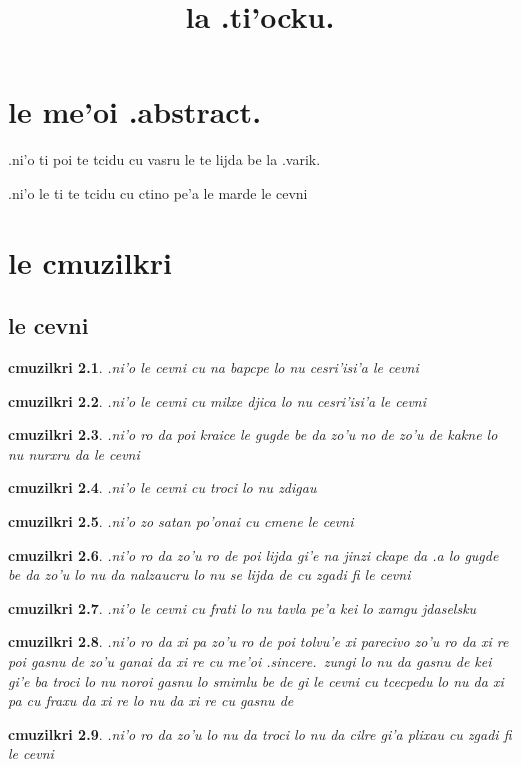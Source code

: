\documentclass{report}
\title{la .ti'ocku.}
\newtheorem{cmuzilkri}{cmuzilkri}
\begin{document}
\maketitle
\chapter{le me'oi .abstract.}
.ni'o ti poi te tcidu cu vasru le te lijda be la .varik.

.ni'o le ti te tcidu cu ctino pe'a le marde le cevni

\chapter{le cmuzilkri}
\section{le cevni}
\begin{cmuzilkri}
	.ni'o le cevni cu na bapcpe lo nu cesri'isi'a le cevni
\end{cmuzilkri}
\begin{cmuzilkri}
	.ni'o le cevni cu milxe djica lo nu cesri'isi'a le cevni
\end{cmuzilkri}
\begin{cmuzilkri}
	.ni'o ro da poi kraice le gugde be da zo'u no de zo'u de kakne lo nu nurxru da le cevni
\end{cmuzilkri}
\begin{cmuzilkri}
	.ni'o le cevni cu troci lo nu zdigau
\end{cmuzilkri}
\begin{cmuzilkri}
	.ni'o zo satan po'onai cu cmene le cevni
\end{cmuzilkri}
\begin{cmuzilkri}
	.ni'o ro da zo'u ro de poi lijda gi'e na jinzi ckape da .a lo gugde be da zo'u lo nu da nalzaucru lo nu se lijda de cu zgadi fi le cevni
\end{cmuzilkri}
\begin{cmuzilkri}
	.ni'o le cevni cu frati lo nu tavla pe'a kei lo xamgu jdaselsku
\end{cmuzilkri}
\begin{cmuzilkri}
	.ni'o ro da xi pa zo'u ro de poi tolvu'e xi parecivo zo'u ro da xi re poi gasnu de zo'u ganai da xi re cu me'oi .sincere.\ zungi lo nu da gasnu de kei gi'e ba troci lo nu noroi gasnu lo smimlu be de gi le cevni cu tcecpedu lo nu da xi pa cu fraxu da xi re lo nu da xi re cu gasnu de
\end{cmuzilkri}
\begin{cmuzilkri}
	.ni'o ro da zo'u lo nu da troci lo nu da cilre gi'a plixau cu zgadi fi le cevni
\end{cmuzilkri}
\end{document}
